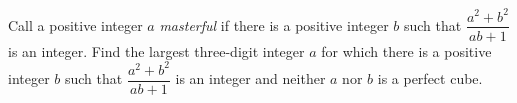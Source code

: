 Call a positive integer $a$ \emph{masterful} if there is a positive integer $b$ such that $\dfrac{a^2+b^2}{ab+1}$ is an integer. Find the largest three-digit integer $a$ for which there is a positive integer $b$ such that $\dfrac{a^2+b^2}{ab+1}$ is an integer and neither $a$ nor $b$ is a perfect cube.
